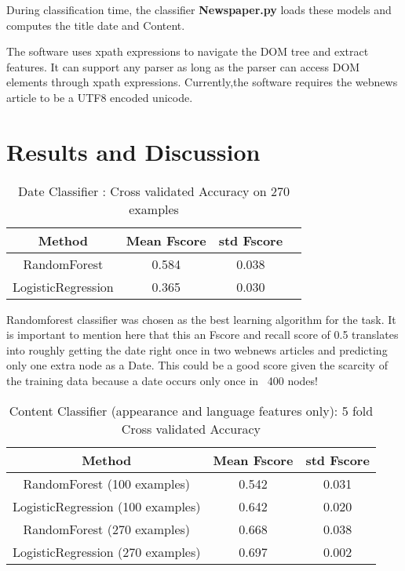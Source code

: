 \documentclass{article} %
\begin{document}
During classification time, the classifier \textbf{Newspaper.py} loads these models and computes the title date and Content.



The software uses xpath expressions to navigate the DOM tree and extract features. It can support any parser as long as the parser can access DOM elements through xpath expressions. Currently,the software requires the webnews article to be a UTF8 encoded unicode.


\section{Results and Discussion}
\label{sec:conclusion}

\begin{table}
  \centering%
  \begin{tabular}{||c c c c||} 
 \hline
 Method & Mean Fscore & std Fscore \\ [0.5ex] 
 \hline
 \hline
 RandomForest & 0.584  & 0.038  \\
 \hline
 LogisticRegression & 0.365 & 0.030  \\
 \hline
 \hline
\end{tabular}
 \caption{Date Classifier : Cross validated Accuracy on 270 examples}\label{table:datefeat}
\end{table}

Randomforest classifier was chosen as the best learning algorithm for the task. It is important to mention here that this an Fscore and recall score of 0.5 translates into roughly getting the date right once in two webnews articles and predicting only one extra node as a Date. This could be a good score given the scarcity of the training data because a date occurs only once in ~400 nodes!


\begin{table}
  \centering%
  \begin{tabular}{c|c|c}
 \hline
 Method & Mean Fscore & std Fscore  \\ [0.5ex] 
 \hline
 \hline
 RandomForest (100 examples) & 0.542  & 0.031  \\
 \hline
 LogisticRegression (100 examples)& 0.642 & 0.020  \\
 \hline
 RandomForest (270 examples) & 0.668  & 0.038  \\
 \hline
 LogisticRegression (270 examples)& 0.697 & 0.002  \\
 \hline
 \hline

  \end{tabular}
 \caption{Content Classifier (appearance and language features only): 5 fold Cross validated Accuracy}\label{table:somename}
\end{table}
\end{document}
